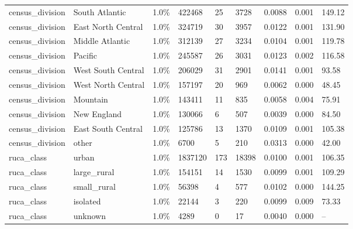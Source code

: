\begin{tabular}{lllllllll}
census\_division & South Atlantic & 1.0\% & 422468 & 25 & 3728 & 0.0088 & 0.001 & 149.12 \\
census\_division & East North Central & 1.0\% & 324719 & 30 & 3957 & 0.0122 & 0.001 & 131.90 \\
census\_division & Middle Atlantic & 1.0\% & 312139 & 27 & 3234 & 0.0104 & 0.001 & 119.78 \\
census\_division & Pacific & 1.0\% & 245587 & 26 & 3031 & 0.0123 & 0.002 & 116.58 \\
census\_division & West South Central & 1.0\% & 206029 & 31 & 2901 & 0.0141 & 0.001 & 93.58 \\
census\_division & West North Central & 1.0\% & 157197 & 20 & 969 & 0.0062 & 0.000 & 48.45 \\
census\_division & Mountain & 1.0\% & 143411 & 11 & 835 & 0.0058 & 0.004 & 75.91 \\
census\_division & New England & 1.0\% & 130066 & 6 & 507 & 0.0039 & 0.000 & 84.50 \\
census\_division & East South Central & 1.0\% & 125786 & 13 & 1370 & 0.0109 & 0.001 & 105.38 \\
census\_division & other & 1.0\% & 6700 & 5 & 210 & 0.0313 & 0.000 & 42.00 \\
ruca\_class & urban & 1.0\% & 1837120 & 173 & 18398 & 0.0100 & 0.001 & 106.35 \\
ruca\_class & large\_rural & 1.0\% & 154151 & 14 & 1530 & 0.0099 & 0.001 & 109.29 \\
ruca\_class & small\_rural & 1.0\% & 56398 & 4 & 577 & 0.0102 & 0.000 & 144.25 \\
ruca\_class & isolated & 1.0\% & 22144 & 3 & 220 & 0.0099 & 0.009 & 73.33 \\
ruca\_class & unknown & 1.0\% & 4289 & 0 & 17 & 0.0040 & 0.000 & -- \\
\hline
\end{tabular}
